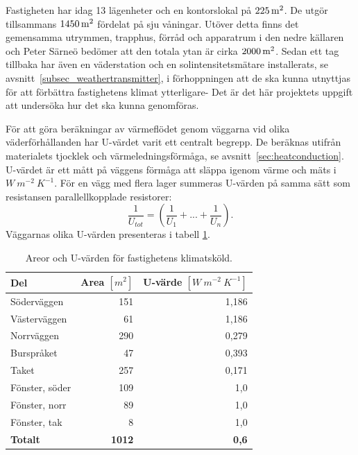 Fastigheten har idag 13 lägenheter och en kontorslokal på $\unit[225]{m^2}$. De utgör tillsammans $\unit[1450]{m^2}$ fördelat på sju våningar. Utöver detta finns det gemensamma utrymmen, trapphus, förråd och apparatrum i den nedre källaren och Peter Särneö\cite{petersarneo} bedömer att den totala ytan är cirka $\unit[2000]{m^2}$. Sedan ett tag tillbaka har även en väderstation och en solintensitetsmätare installerats, se avsnitt~\ref{subsec_weathertransmitter}, i förhoppningen att de ska kunna utnyttjas för att förbättra fastighetens klimat ytterligare- Det är det här projektets uppgift att undersöka hur det ska kunna genomföras.

För att göra beräkningar av värmeflödet genom väggarna vid olika väderförhållanden har U-värdet varit ett centralt begrepp. De beräknas utifrån materialets tjocklek och värmeledningsförmåga, se avsnitt~\ref{sec:heatconduction}. U-värdet är ett mått på väggens förmåga att släppa igenom värme och mäts i $\unit{W~m^{-2}~K^{-1}}$. För en vägg med flera lager summeras U-värden på samma sätt som resistansen parallellkopplade resistorer:
\begin{equation}
\label{eq:uvalue}
\frac{1}{U_{tot}}= (\frac{1}{U_1}+...+\frac{1}{U_n}).
\end{equation}
Väggarnas olika U-värden presenteras i tabell \ref{tbl:uvalue}.

\begin{table}[hbtp]
\centering
\caption{Areor och U-värden för fastighetens klimatsköld.}
\label{tbl:uvalue}

\begin{tabular}
{|l|r|r|}
\hline
\textbf{Del} & \textbf{Area $[\unit{m^2}]$} & \parbox[c][1.2cm][c]{2 cm}{\textbf{U-värde\\$[\unit{W~m^{-2}~K^{-1}}]$}} \\
\hline
Söderväggen &  151 & 1,186 \\ 
Västerväggen & 61 & 1,186 \\
Norrväggen & 290 & 0,279 \\
Burspråket & 47 & 0,393 \\
Taket & 257 & 0,171 \\
\hline
Fönster, söder & 109 & 1,0 \\
Fönster, norr & 89 & 1,0 \\
Fönster, tak & 8 & 1,0 \\
\hline
\textbf{Totalt} & \textbf{1012} & \textbf{0,6}\\
\hline
\end{tabular}
\end{table}

